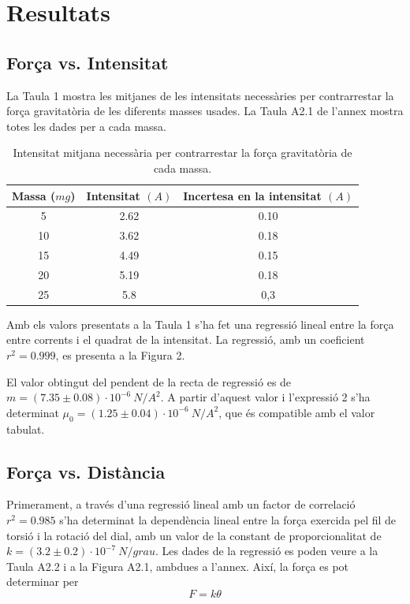 \section{Resultats}
\subsection{Força vs. Intensitat}
La Taula 1 mostra les mitjanes de les intensitats necessàries per contrarrestar la força gravitatòria de les diferents masses usades. La Taula A2.1 %
de l'annex mostra totes les dades per a cada massa.

\begin{table}
	\centering
	\caption{Intensitat mitjana necessària per contrarrestar la força gravitatòria de cada massa.}
	\vspace{0.5cm}
	\begin{tabular}{|c|c|c|}
		\hline
		\textbf{Massa ($\si{mg}$)}&\textbf{Intensitat} $\si{(A)}$& \textbf{Incertesa en la intensitat} $\si{(A)}$\\ \hline
		5 & 2.62 & 0.10 \\ \hline
			10 & 3.62 & 0.18 \\ \hline 
				15 & 4.49 & 0.15 \\ \hline 
					20 & 5.19 & 0.18 \\ \hline 
						25 & 5.8 & 0,3 \\ \hline  
	\end{tabular}
\end{table}
Amb els valors presentats a la Taula 1 s'ha fet una regressió lineal entre la força entre corrents i el quadrat de la intensitat. La regressió, amb un coeficient $r^2=0.999$, es presenta a la Figura 2.

El valor obtingut del pendent de la recta de regressió es de $m=(7.35\pm0.08)\cdot10^{-6}\ \si{N/A^2}$. A partir d'aquest valor i l'expressió 2 s'ha determinat $\mu_0=(1.25\pm0.04)\cdot10^{-6}\ \si{N/A^2}$, que és compatible amb el valor tabulat.
\subsection{Força vs. Distància}
Primerament, a través d'una regressió lineal amb un factor de correlació $r^2=0.985$ s'ha determinat la dependència lineal entre la força exercida pel fil de torsió i la rotació del dial, amb un valor de la constant de proporcionalitat de $k=(3.2\pm0.2)\cdot10^{-7}\ \si{N/grau}$. Les dades de la regressió es poden veure a la Taula A2.2 i a la Figura A2.1, ambdues a l'annex. Així, la força es pot determinar per
\begin{equation}
	F=k\theta
\end{equation}

